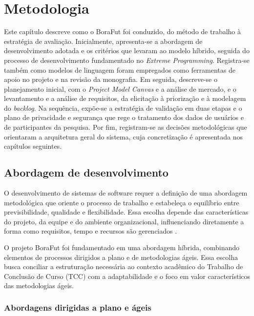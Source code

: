 \chapter{Metodologia}

    Este capítulo descreve como o BoraFut foi conduzido, do método de trabalho à estratégia de avaliação. Inicialmente, apresenta-se a abordagem de desenvolvimento adotada e os critérios que levaram ao modelo híbrido, seguida do processo de desenvolvimento fundamentado no \textit{Extreme Programming}. Registra-se também como modelos de linguagem foram empregados como ferramentas de apoio no projeto e na revisão da monografia. Em seguida, descreve-se o planejamento inicial, com o \textit{Project Model Canvas} e a análise de mercado, e o levantamento e a análise de requisitos, da elicitação à priorização e à modelagem do \textit{backlog}. Na sequência, expõe-se a estratégia de validação em duas etapas e o plano de privacidade e segurança que rege o tratamento dos dados de usuários e de participantes da pesquisa. Por fim, registram-se as decisões metodológicas que orientaram a arquitetura geral do sistema, cuja concretização é apresentada nos capítulos seguintes.

\section{Abordagem de desenvolvimento}

    O desenvolvimento de sistemas de software requer a definição de uma abordagem metodológica que oriente o processo de trabalho e estabeleça o equilíbrio entre previsibilidade, qualidade e flexibilidade. Essa escolha depende das características do projeto, da equipe e do ambiente organizacional, influenciando diretamente a forma como requisitos, tempo e recursos são gerenciados \cite{pressman2019}.

    O projeto BoraFut foi fundamentado em uma abordagem híbrida, combinando elementos de processos dirigidos a plano e de metodologias ágeis. Essa escolha busca conciliar a estruturação necessária ao contexto acadêmico do Trabalho de Conclusão de Curso (TCC) com a adaptabilidade e o foco em valor característicos das metodologias ágeis.

    \subsection{Abordagens dirigidas a plano e ágeis}

